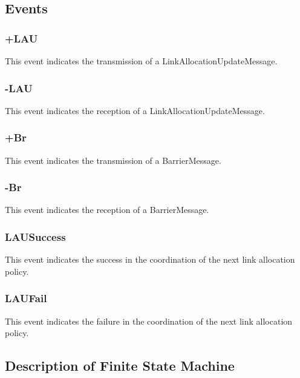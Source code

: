 \subsection{Events}

\subsubsection{+LAU}
This event indicates the transmission of a LinkAllocationUpdateMessage.

\subsubsection{-LAU}
This event indicates the reception of a LinkAllocationUpdateMessage.

\subsubsection{+Br}
This event indicates the transmission of a BarrierMessage.

\subsubsection{-Br}
This event indicates the reception of a BarrierMessage.

\subsubsection{LAUSuccess}
This event indicates the success in the coordination of the next link allocation policy.

\subsubsection{LAUFail}
This event indicates the failure in the coordination of the next link allocation policy.

\newpage

\subsection{Description of Finite State Machine}

